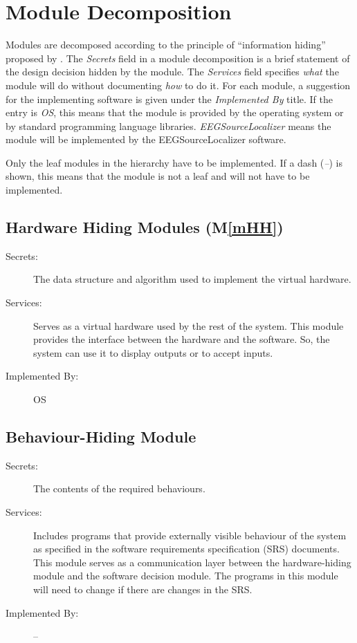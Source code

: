 \documentclass[12pt, titlepage]{article}
\newcommand{\mref}[1]{M\ref{#1}}
\renewcommand{\progname}{EEGSourceLocalizer}
\begin{document}
\section{Module Decomposition} \label{SecMD}

Modules are decomposed according to the principle of ``information hiding''
proposed by \citet{ParnasEtAl1984}. The \emph{Secrets} field in a module
decomposition is a brief statement of the design decision hidden by the
module. The \emph{Services} field specifies \emph{what} the module will do
without documenting \emph{how} to do it. For each module, a suggestion for the
implementing software is given under the \emph{Implemented By} title. If the
entry is \emph{OS}, this means that the module is provided by the operating
system or by standard programming language libraries.  \emph{\progname{}} means the
module will be implemented by the \progname{} software.

Only the leaf modules in the hierarchy have to be implemented. If a dash
(\emph{--}) is shown, this means that the module is not a leaf and will not have
to be implemented.

\subsection{Hardware Hiding Modules (\mref{mHH})}

\begin{description}
\item[Secrets:]The data structure and algorithm used to implement the virtual
  hardware.
\item[Services:]Serves as a virtual hardware used by the rest of the
  system. This module provides the interface between the hardware and the
  software. So, the system can use it to display outputs or to accept inputs.
\item[Implemented By:] OS
\end{description}

\subsection{Behaviour-Hiding Module}

\begin{description}
\item[Secrets:]The contents of the required behaviours.
\item[Services:]Includes programs that provide externally visible behaviour of
  the system as specified in the software requirements specification (SRS)
  documents. This module serves as a communication layer between the
  hardware-hiding module and the software decision module. The programs in this
  module will need to change if there are changes in the SRS.
\item[Implemented By:] --
\end{description}
\end{document}
